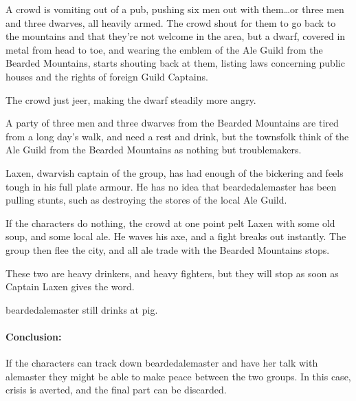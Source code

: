 \begin{multicols}{2}

\begin{boxtext}
	A crowd is vomiting out of a pub, pushing six men out with them\ldots or three men and three dwarves, all heavily armed.
	The crowd shout for them to go back to the mountains and that they're not welcome in the area, but a dwarf, covered in metal from head to toe, and wearing the emblem of the Ale Guild from the Bearded Mountains, starts shouting back at them, listing laws concerning public houses and the rights of foreign Guild Captains.

	The crowd just jeer, making the dwarf steadily more angry.
\end{boxtext}

A party of three men and three dwarves from the Bearded Mountains are tired from a long day's walk, and need a rest and drink, but the townsfolk think of the Ale Guild from the Bearded Mountains as nothing but troublemakers.

Laxen, dwarvish captain of the group, has had enough of the bickering and feels tough in his full plate armour.
He has no idea that \gls{beardedalemaster} has been pulling stunts, such as destroying the stores of the local Ale Guild.

If the characters do nothing, the crowd at one point pelt Laxen with some old soup, and some local ale.  He waves his axe, and a fight breaks out instantly.  The group then flee the city, and all ale trade with the Bearded Mountains stops.

\dwarvensoldier


These two are heavy drinkers, and heavy fighters, but they will stop as soon as Captain Laxen gives the word.

\dwarventrader


\humansoldier

\Gls{beardedalemaster} still drinks at \gls{pig}.  

\paragraph{Conclusion:} If the characters can track down \gls{beardedalemaster} and have her talk with \gls{alemaster} they might be able to make peace between the two groups.
In this case, crisis is averted, and the final part can be discarded.


\end{multicols}
